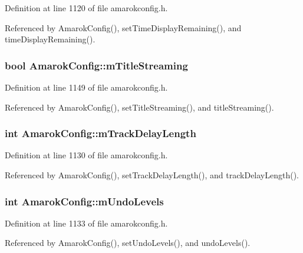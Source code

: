 Definition at line 1120 of file amarokconfig.h.

Referenced by Amarok\-Config(), set\-Time\-Display\-Remaining(), and time\-Display\-Remaining().
\subsubsection{\setlength{\rightskip}{0pt plus 5cm}bool {\bf Amarok\-Config::m\-Title\-Streaming}\hspace{0.3cm}{\tt  [protected]}}\label{classAmarokConfig_AmarokConfigp33}




Definition at line 1149 of file amarokconfig.h.

Referenced by Amarok\-Config(), set\-Title\-Streaming(), and title\-Streaming().
\subsubsection{\setlength{\rightskip}{0pt plus 5cm}int {\bf Amarok\-Config::m\-Track\-Delay\-Length}\hspace{0.3cm}{\tt  [protected]}}\label{classAmarokConfig_AmarokConfigp16}




Definition at line 1130 of file amarokconfig.h.

Referenced by Amarok\-Config(), set\-Track\-Delay\-Length(), and track\-Delay\-Length().
\subsubsection{\setlength{\rightskip}{0pt plus 5cm}int {\bf Amarok\-Config::m\-Undo\-Levels}\hspace{0.3cm}{\tt  [protected]}}\label{classAmarokConfig_AmarokConfigp19}




Definition at line 1133 of file amarokconfig.h.

Referenced by Amarok\-Config(), set\-Undo\-Levels(), and undo\-Levels().
